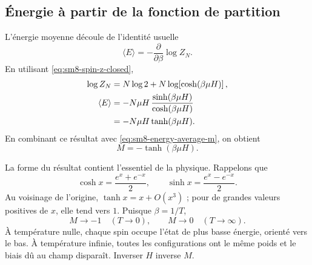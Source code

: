 \begin{classroomqa}
\end{classroomqa}

\subsection{Énergie à partir de la fonction de partition}

L’énergie moyenne découle de l’identité usuelle
\begin{equation}
 \langle E\rangle
 =-\frac{\partial}{\partial\beta}\log Z_N.
 \label{eq:sm8-energy-identity}
\end{equation}
En utilisant \eqref{eq:sm8-spin-z-closed},
\begin{align}
 \log Z_N
 &=N\log 2+N\log\!\left[\cosh(\beta\mu H)\right],
 \notag\\
 \langle E\rangle
 &=-N\mu H\,
   \frac{\sinh(\beta\mu H)}{\cosh(\beta\mu H)}
 \notag\\
 &=-N\mu H\tanh(\beta\mu H).
 \label{eq:sm8-average-energy}
\end{align}
En combinant ce résultat avec \eqref{eq:sm8-energy-average-m}, on obtient
\begin{equation}
 \boxed{M=-\tanh(\beta\mu H)}.
 \label{eq:sm8-magnetization-tanh}
\end{equation}

La forme du résultat contient l’essentiel de la physique. Rappelons que
\begin{equation}
 \cosh x=\frac{e^x+e^{-x}}{2},
 \qquad
 \sinh x=\frac{e^x-e^{-x}}{2}.
 \label{eq:sm8-hyperbolic-definitions}
\end{equation}
Au voisinage de l’origine, \(\tanh x=x+O(x^3)\) ; pour de grandes valeurs positives de \(x\), elle tend vers
\(1\). Puisque \(\beta=1/T\),
\begin{equation}
 M\longrightarrow -1
 \quad (T\longrightarrow0),
 \qquad
 M\longrightarrow 0
 \quad (T\longrightarrow\infty).
 \label{eq:sm8-magnetization-limits}
\end{equation}
À température nulle, chaque spin occupe l’état de plus basse énergie, orienté vers le bas. À température infinie, toutes les configurations ont le même poids et le biais dû au champ disparaît. Inverser \(H\) inverse \(M\).

